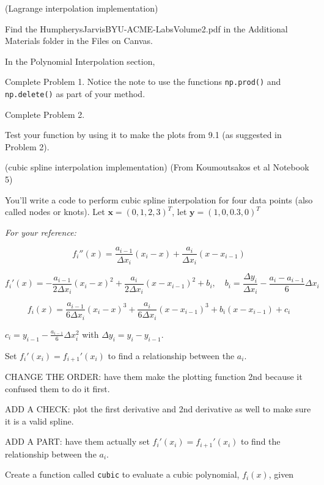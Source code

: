 \documentclass[12pt,letterpaper,noanswers]{exam}
\newcommand{\vc}[1]{\boldsymbol{#1}}
\begin{document}
\begin{questions}
\begin{parts}
\end{parts}  


\item (Lagrange interpolation implementation) 

Find the HumpherysJarvisBYU-ACME-LabsVolume2.pdf in the Additional Materials folder in the Files on Canvas.

In the Polynomial Interpolation section, 
\begin{parts}
\item Complete Problem 1.  Notice the note to use the functions \texttt{np.prod()} and \texttt{np.delete()} as part of your method.
\item Complete Problem 2.
\item Test your function by using it to make the plots from 9.1 (as suggested in Problem 2).
\end{parts}

\item (cubic spline interpolation implementation) (From Koumoutsakos et al Notebook 5)

You'll write a code to perform cubic spline interpolation for four data points (also called nodes or knots). Let $\vc{x} = (0,1,2,3)^T$, let $\vc{y} = (1,0,0.3,0)^T$

\emph{For your reference:}

\[f_i''(x) = \frac{a_{i-1}}{\Delta x_i}(x_i-x) + \frac{a_i}{\Delta x_i}(x-x_{i-1})\]

\[f_i'(x) = -\frac{a_{i-1}}{2\Delta x_i}(x_i-x)^2 + \frac{a_i}{2\Delta x_i}(x-x_{i-1})^2+b_i,\quad b_i = \frac{\Delta y_i}{\Delta x_i} - \frac{a_i-a_{i-1}}{6}\Delta x_i\]

\[f_i(x) = \frac{a_{i-1}}{6\Delta x_i}(x_i-x)^3 + \frac{a_i}{6\Delta x_i}(x-x_{i-1})^3+b_i(x-x_{i-1})+ c_i\]

$c_i = y_{i-1} - \frac{a_{i-1}}{6}\Delta x_i^2$ with $\Delta y_i = y_i - y_{i-1}$.

Set $f_i'(x_i) = f_{i+1}'(x_i)$ to find a relationship between the $a_i$.

CHANGE THE ORDER: have them make the plotting function 2nd because it confused them to do it first.

ADD A CHECK: plot the first derivative and 2nd derivative as well to make sure it is a valid spline.

ADD A PART: have them actually set $f_i'(x_i) = f_{i+1}'(x_i)$ to find the relationship between the $a_i$.

\begin{parts}
\item Create a function called \texttt{cubic} to evaluate a cubic polynomial, $f_i(x)$, given


\end{parts}
\end{questions}
\end{document}
